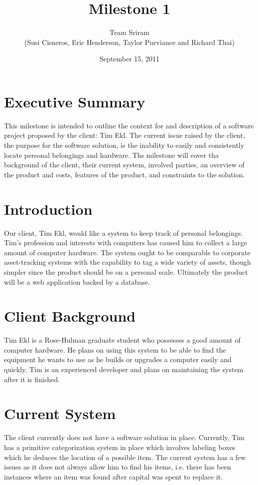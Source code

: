 \documentclass{article}
\begin{document}
\setlength{\voffset}{3.5in}
\title{Milestone 1}
\author{Team Sriram\\
(Susi Cisneros, Eric Henderson, Taylor Purviance and Richard Thai)}
\date{September 15, 2011}
\maketitle
\clearpage
\setlength{\voffset}{0pt}
\tableofcontents
\clearpage
\section{Executive Summary}
This milestone is intended to outline the context for and description of a software project proposed by the client: Tim Ekl. The current issue raised by the client, the purpose for the software solution, is the inability to easily and consistently locate personal belongings and hardware. Ths milestone will cover tha background of the client, their current system, involved parties, an overview of the product and costs, features of the product, and constraints to the solution.

\section{Introduction}
Our client, Tim Ekl, would like a system to keep track of personal belongings. Tim’s profession and interests with computers has caused him to collect a large amount of computer hardware. The system ought to be comparable to corporate asset-tracking systems with the capability to tag a wide variety of assets, though simpler since the product should be on a personal scale. Ultimately the product will be a web application backed by a database.

\section{Client Background}
Tim Ekl is a Rose-Hulman graduate student who possesses a good amount of computer hardware.  He plans on using this system to be able to find the equipment he wants to use as he builds or upgrades a computer easily and quickly.  Tim is an experienced developer and plans on maintaining the system after it is finished.  

\section{Current System}
The client currently does not have a software solution in place.  Currently, Tim has a primitive categorization system in place which involves labeling boxes which he deduces the location of a possible item.  The current system has a few issues as it does not always allow him to find his items, i.e. there has been instances where an item was found after capital was spent to replace it.
\end{document}
